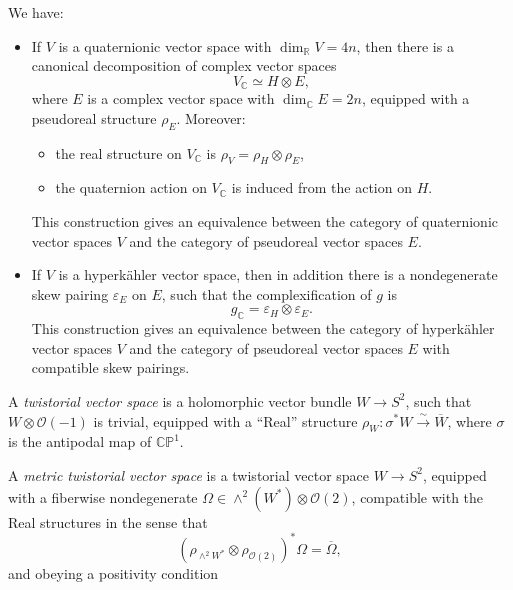 \documentclass[12pt,letterpaper,reqno]{article}
\numberwithin{equation}{section}
\newcommand{\cO}{\ensuremath{\mathcal O}}
\newcommand{\R}{\ensuremath{\mathbb R}}
\newcommand{\C}{\ensuremath{\mathbb C}}
\newcommand{\PP}{\ensuremath{\mathbb P}}
\newcommand{\hk}{hyperk\"ahler\xspace}
\newcommand{\simarrow}{\xrightarrow\sim}
\newcommand{\ti}[1]{\textit{#1}}
\newcommand{\fixme}[1]{{\color{orange}{[#1]}}}
\begin{document}
\begin{prop}
We have:
\begin{itemize}
\item If $V$ is a quaternionic vector space with $\dim_\R V = 4n$, then
there is a canonical decomposition of complex vector spaces
\begin{equation}
  V_\C \simeq H \otimes E,
\end{equation}
where $E$ is a complex vector space with $\dim_\C E = 2n$,
equipped with a pseudoreal structure $\rho_E$. Moreover:
\begin{itemize}
  \item the real structure on $V_\C$ is $\rho_V = \rho_H \otimes \rho_E$,
  \item the quaternion action on $V_\C$ is induced from the action on $H$.
\end{itemize}
This construction gives an equivalence between the category of
quaternionic vector spaces $V$ and the category of pseudoreal
vector spaces $E$.

\item If $V$ is a \hk vector space, then in addition there is
a nondegenerate skew pairing $\varepsilon_E$ on $E$, such
that the complexification of $g$ is
\begin{equation}
 g_\C = \varepsilon_H \otimes \varepsilon_E.
\end{equation}
This construction gives an equivalence between the category
of \hk vector spaces $V$ and the category of pseudoreal vector spaces $E$
with compatible skew pairings.
\end{itemize}
\end{prop}

\begin{pf} \fixme{...}
\end{pf}

\begin{defn} A \ti{twistorial vector space}
is a holomorphic vector bundle $W \to S^2$, such that
$W \otimes \cO(-1)$ is trivial, equipped with
a ``Real'' structure $\rho_W: \sigma^* W \simarrow \overline{W}$, where
$\sigma$ is the antipodal map of $\C\PP^1$.
\end{defn}

\begin{defn} \label{def:metric-twistorial-vector-space} A \ti{metric twistorial
vector space} is a twistorial vector space $W \to S^2$, equipped with
a fiberwise nondegenerate $\Omega \in \wedge^2(W^*) \otimes \cO(2)$,
compatible with the Real structures in the sense that
\begin{equation}
  (\rho_{\wedge^2 W^*} \otimes \rho_{\cO(2)})^*\Omega = \overline\Omega,
\end{equation}
and obeying a positivity condition \fixme{...}
\end{defn}
\end{document}
